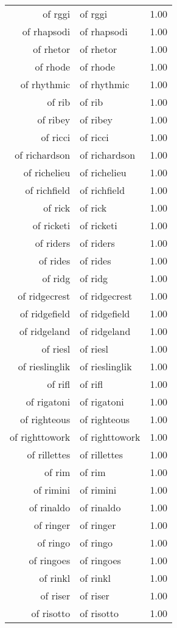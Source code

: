 \begin{table}[ht]
\begin{tabular}{rlr}
  of rggi & of rggi & 1.00 \\ 
  of rhapsodi & of rhapsodi & 1.00 \\ 
  of rhetor & of rhetor & 1.00 \\ 
  of rhode & of rhode & 1.00 \\ 
  of rhythmic & of rhythmic & 1.00 \\ 
  of rib & of rib & 1.00 \\ 
  of ribey & of ribey & 1.00 \\ 
  of ricci & of ricci & 1.00 \\ 
  of richardson & of richardson & 1.00 \\ 
  of richelieu & of richelieu & 1.00 \\ 
  of richfield & of richfield & 1.00 \\ 
  of rick & of rick & 1.00 \\ 
  of ricketi & of ricketi & 1.00 \\ 
  of riders & of riders & 1.00 \\ 
  of rides & of rides & 1.00 \\ 
  of ridg & of ridg & 1.00 \\ 
  of ridgecrest & of ridgecrest & 1.00 \\ 
  of ridgefield & of ridgefield & 1.00 \\ 
  of ridgeland & of ridgeland & 1.00 \\ 
  of riesl & of riesl & 1.00 \\ 
  of rieslinglik & of rieslinglik & 1.00 \\ 
  of rifl & of rifl & 1.00 \\ 
  of rigatoni & of rigatoni & 1.00 \\ 
  of righteous & of righteous & 1.00 \\ 
  of righttowork & of righttowork & 1.00 \\ 
  of rillettes & of rillettes & 1.00 \\ 
  of rim & of rim & 1.00 \\ 
  of rimini & of rimini & 1.00 \\ 
  of rinaldo & of rinaldo & 1.00 \\ 
  of ringer & of ringer & 1.00 \\ 
  of ringo & of ringo & 1.00 \\ 
  of ringoes & of ringoes & 1.00 \\ 
  of rinkl & of rinkl & 1.00 \\ 
  of riser & of riser & 1.00 \\ 
  of risotto & of risotto & 1.00 \\ 

\end{tabular}
\end{table}
